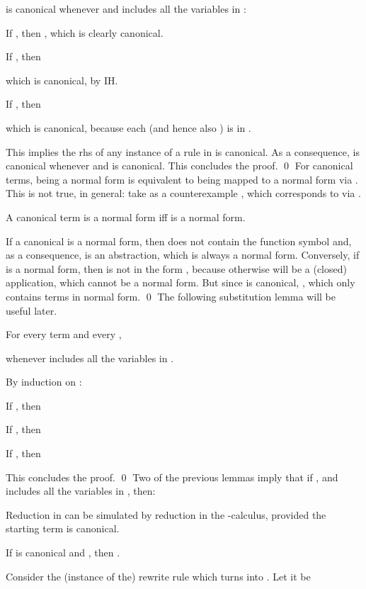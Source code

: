 \documentclass{LMCS}
\newenvironment{varitemize}
{
\begin{list}{\labelitemi}
{\setlength{\itemsep}{0.0mm}
 \setlength{\topsep}{0.0mm}
 \setlength{\parindent}{0.0mm}
 \setlength{\parskip}{0.0mm}
 \setlength{\parsep}{0.0mm}
 \setlength{\partopsep}{0.0mm}
 \setlength{\leftmargin}{15pt}
 \setlength{\labelsep}{5pt}
 \setlength{\labelwidth}{10pt}}}
{
 \end{list} 
}
\begin{document}
is canonical whenever  and
 includes all the variables in :
\begin{varitemize}
\item
  If , then , which is
  clearly canonical.
\item
  If , then
  
  which is canonical, by IH.
\item
  If , then
  
  which is canonical, because each  (and hence also ) is in .
\end{varitemize}
This implies the rhs of any instance of a rule in  is canonical. As a consequence,
 is canonical whenever  and  is canonical.
This concludes the proof. 
\qed
For canonical terms, being a normal form is equivalent to being mapped to a normal
form via . This is not true, in general: take as a counterexample
,
which corresponds to  via .
\begin{lem}\label{lemma:NFcanonical}
A canonical term  is a normal form iff 
 is a normal form.
\end{lem}
\proof
If a canonical  is a normal form, then  does not contain the function symbol  and,
as a consequence,  is an abstraction, which is always a normal form.
Conversely, if  is a normal form, then
 is not in the form , because otherwise
 will be a (closed) application, which cannot be a normal form.
But since  is canonical, , which only contains terms
in normal form.
\qed
The following substitution lemma will be useful later.
\begin{lem}[Substitution]
For every term  and every ,

whenever  includes all the variables in .
\end{lem}
\proof
By induction on :
\begin{varitemize}
  \item
    If , then 
    
  \item
    If , then
    
  \item
    If , then
    
\end{varitemize}
This concludes the proof.
\qed
Two of the previous lemmas imply that if , 
 and  
includes all the variables in , then:

Reduction in  can be simulated by reduction in the -calculus,
provided the starting term is canonical.  
\begin{lem}\label{lemma:TRStolam}
If  is canonical and , then
.
\end{lem}
\proof
Consider the (instance of the) rewrite rule which
turns  into . Let it be
\end{document}
